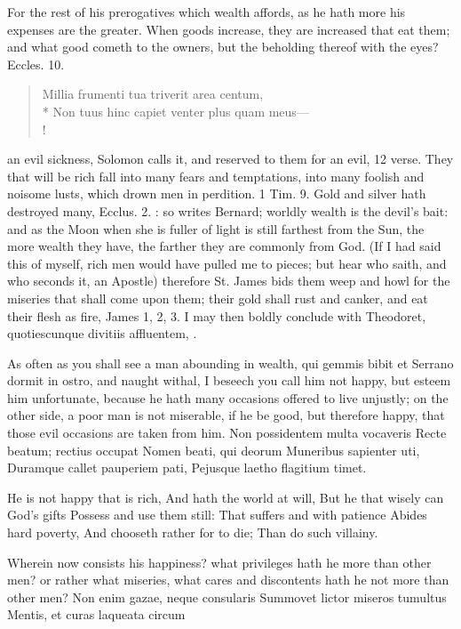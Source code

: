 {For the rest of his prerogatives which wealth affords, as he hath more
his expenses are the greater. When goods increase, they are increased
that eat them; and what good cometh to the owners, but the beholding
thereof with the eyes? Eccles.  10.
%
\begin{latin}
\begin{verse}
Millia frumenti tua triverit area centum,\\*
Non tuus hinc capiet venter plus quam meus---\\!
\end{verse}
\end{latin}
%
an evil sickness, Solomon calls it, and reserved to them for an evil,
12 verse. They that will be rich fall into many fears and temptations,
into many foolish and noisome lusts, which drown men in perdition. 1
Tim.  9. Gold and silver hath destroyed many, Ecclus.  2.
: so writes Bernard; worldly wealth
is the devil's bait: and as the Moon when she is fuller of light is
still farthest from the Sun, the more wealth they have, the farther
they are commonly from God. (If I had said this of myself, rich men
would have pulled me to pieces; but hear who saith, and who seconds it,
an Apostle) therefore St. James bids them weep and howl for the
miseries that shall come upon them; their gold shall rust and canker,
and eat their flesh as fire, James  1, 2, 3. I may then boldly
conclude with Theodoret, quotiescunque divitiis affluentem, \etc{}.

As often as you shall see a man abounding in wealth, qui gemmis bibit
et Serrano dormit in ostro, and naught withal, I beseech you call him
not happy, but esteem him unfortunate, because he hath many occasions
offered to live unjustly; on the other side, a poor man is not
miserable, if he be good, but therefore happy, that those evil
occasions are taken from him.
Non possidentem multa vocaveris
Recte beatum; rectius occupat
Nomen beati, qui deorum
Muneribus sapienter uti,
Duramque callet pauperiem pati,
Pejusque laetho flagitium timet.

He is not happy that is rich,
And hath the world at will,
But he that wisely can God's gifts
Possess and use them still:
That suffers and with patience
Abides hard poverty,
And chooseth rather for to die;
Than do such villainy.

Wherein now consists his happiness? what privileges hath he more than
other men? or rather what miseries, what cares and discontents hath he
not more than other men?
Non enim gazae, neque consularis
Summovet lictor miseros tumultus
Mentis, et curas laqueata circum

}
